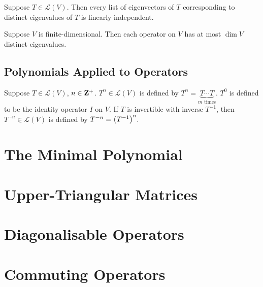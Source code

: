 \begin{proposition}
Suppose $T\in\mathcal{L}(V)$. Then every list of eigenvectors of $T$ corresponding to distinct eigenvalues of $T$ is linearly independent.
\end{proposition}

\begin{proposition}
Suppose $V$ is finite-dimensional. Then each operator on $V$ has at most $\dim V$ distinct eigenvalues.
\end{proposition}

\subsection{Polynomials Applied to Operators}
\begin{notation}
Suppose $T\in\mathcal{L}(V)$, $n\in\mathbf Z^+$. $T^n\in\mathcal{L}(V)$ is defined by $T^n=\underbrace{T\cdots T}_\text{$m$ times}$. $T^0$ is defined to be the identity operator $I$ on $V$. If $T$ is invertible with inverse $T^{-1}$, then $T^{-n}\in\mathcal{L}(V)$ is defined by $T^{-n}=\left(T^{-1}\right)^n$.
\end{notation}



\section{The Minimal Polynomial}
\section{Upper-Triangular Matrices}
\section{Diagonalisable Operators}
\section{Commuting Operators}